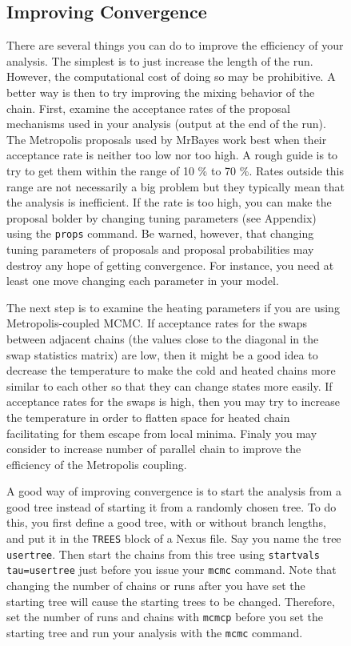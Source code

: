 \documentclass[12pt]{book}
\newcommand{\ttt}[1]{\texttt{#1}}
\begin{document}
\begin{figure}[h]
\subsection{Improving Convergence}

There are several things you can do to improve the efficiency of your analysis. The simplest is to
just increase the length of the run. However, the computational cost of doing so may be
prohibitive. A better way is then to try improving the mixing behavior of the chain. First, examine
the acceptance rates of the proposal mechanisms used in your analysis (output at the end of the
run). The Metropolis proposals used by MrBayes work best when their acceptance rate is neither too
low nor too high. A rough guide is to try to get them within the range of 10 \% to 70 \%. Rates
outside this range are not necessarily a big problem but they typically mean that the analysis is
inefficient. If the rate is too high, you can make the proposal bolder by changing tuning
parameters (see Appendix) using the \ttt{props} command. Be warned, however, that changing tuning
parameters of proposals and proposal probabilities may destroy any hope of getting convergence. For
instance, you need at least one move changing each parameter in your model.

The next step is to examine the heating parameters if you are using Metropolis-coupled MCMC. If
acceptance rates for the swaps between adjacent chains (the values close to the diagonal in the
swap statistics matrix) are low, then it might be a good idea to decrease the temperature to make
the cold and heated chains more similar to each other so that they can change states more easily.
If acceptance rates for the swaps is high, then you may try to increase the temperature in order to
flatten space for heated chain facilitating for them escape from local minima. Finaly you may
consider to increase number of parallel chain to improve the efficiency of the Metropolis coupling.

A good way of improving convergence is to start the analysis from a good tree instead of starting
it from a randomly chosen tree. To do this, you first define a good tree, with or without branch
lengths, and put it in the \ttt{TREES} block of a Nexus file. Say you name the tree \ttt{usertree}.
Then start the chains from this tree using \ttt{startvals tau=usertree} just before you issue your
\ttt{mcmc} command. Note that changing the number of chains or runs after you have set the starting
tree will cause the starting trees to be changed. Therefore, set the number of runs and chains with
\ttt{mcmcp} before you set the starting tree and run your analysis with the \ttt{mcmc} command.


\end{figure}
\end{document}
